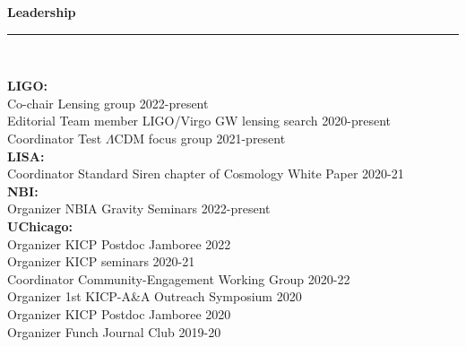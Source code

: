 \documentclass[11pt,a4paper]{article}
\newcommand{\secsizesmall}{0.05\linewidth}
\newcommand{\contsizelong}{0.95\linewidth}
\newcommand{\sectionsep}{12pt}
\newcounter{seminars}
\begin{document}
\vspace{-5pt}
\vspace{\sectionsep}
\textbf{Leadership} \vspace{-8pt}\\ {\rule{\linewidth}{0.6pt}}\vspace{5pt}\\
\begin{minipage}[t]{\secsizesmall}
\begin{flushleft}
\end{flushleft}
\end{minipage}
\begin{minipage}[t]{\contsizelong}
\begin{flushleft}
\textbf{LIGO:} \\ Co-chair Lensing group \hfill 2022-present \\Editorial Team member LIGO/Virgo GW lensing search \hfill 2020-present \\ Coordinator Test $\Lambda$CDM focus group \hfill 2021-present  \\
\textbf{LISA:} \\ Coordinator Standard Siren chapter of Cosmology White Paper \hfill 2020-21 \\
\textbf{NBI:} \\ Organizer NBIA Gravity Seminars \hfill 2022-present \\
\textbf{UChicago:} \\ Organizer KICP Postdoc Jamboree \hfill 2022 \\ Organizer KICP seminars \hfill 2020-21 \\Coordinator Community-Engagement Working Group \hfill 2020-22 \\Organizer 1st KICP-A\&A  Outreach Symposium \hfill 2020 \\Organizer KICP Postdoc Jamboree \hfill 2020 \\Organizer Funch Journal Club \hfill 2019-20 
\end{flushleft}
\end{minipage}
\end{document}

